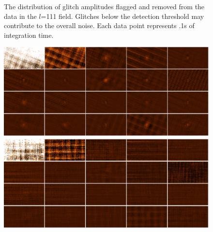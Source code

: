 \documentclass[12pt,preprint]{aastex}
\newcommand{\lon}{\ensuremath{l}}
\def\Figure#1#2#3#4{
\begin{figure}[htb]
\epsscale{#4}
\plotone{#1}
\caption{#2}
\label{#3}
\end{figure}
}
\def\FigureTwo#1#2#3#4#5{
\begin{figure}[htb]
\epsscale{#5}
\plottwo{#1}{#2}
\caption{#3}
\label{#4}
\end{figure}
}
\begin{document}
%
\Figure{crs}{The distribution of glitch amplitudes flagged and removed from the
data in the \lon=111 field.  Glitches below the detection threshold may
contribute to the overall noise.  Each data point represents .1s of integration
time.}{fig:GlitchDistribution}{1.0}

\begin{figure}
  \begin{minipage}{6.5in}
    \begin{center}
      \includegraphics[angle=270,scale=0.6]{eachpca}
    \end{center}
  \end{minipage}
\vspace{0.25in}
  \begin{minipage}{6.5in}
    \begin{center}
      \includegraphics[angle=270,scale=0.6]{eachpca_20iters}
    \end{center}

\end{minipage}
\end{figure}
\end{document}
